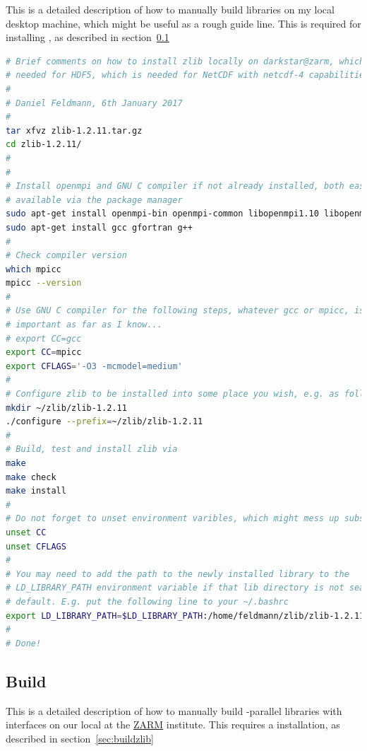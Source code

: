 \documentclass[a4paper, 11pt, DIV=11]{scrartcl}
\begin{document}
This is a detailed description of how to manually build 
libraries on my local desktop machine, which might be useful as
a rough guide line. This is required
for installing \hdf, as described in section~\ref{sec:buildhdf}
\begin{lstlisting}[language=bash]
# Brief comments on how to install zlib locally on darkstar@zarm, which is
# needed for HDF5, which is needed for NetCDF with netcdf-4 capabilities.
#
# Daniel Feldmann, 6th January 2017
# 
tar xfvz zlib-1.2.11.tar.gz
cd zlib-1.2.11/
#
#
# Install openmpi and GNU C compiler if not already installed, both easily
# available via the package manager
sudo apt-get install openmpi-bin openmpi-common libopenmpi1.10 libopenmpi-dev mpi-default-bin mpi-default-dev
sudo apt-get install gcc gfortran g++
#
# Check compiler version
which mpicc
mpicc --version
#
# Use GNU C compiler for the following steps, whatever gcc or mpicc, is not
# important as far as I know...
# export CC=gcc
export CC=mpicc
export CFLAGS='-O3 -mcmodel=medium'
#
# Configure zlib to be installed into some place you wish, e.g. as follows 
mkdir ~/zlib/zlib-1.2.11
./configure --prefix=~/zlib/zlib-1.2.11
#
# Build, test and install zlib via
make
make check
make install
#
# Do not forget to unset environment varibles, which might mess up subsequent builds
unset CC
unset CFLAGS
#
# You may need to add the path to the newly installed library to the
# LD_LIBRARY_PATH environment variable if that lib directory is not searched by
# default. E.g. put the following line to your ~/.bashrc
export LD_LIBRARY_PATH=$LD_LIBRARY_PATH:/home/feldmann/zlib/zlib-1.2.11/lib
# 
# Done!
\end{lstlisting}



\subsection{Build \hdf}
\label{sec:buildhdf}
This is a detailed description of how to manually build \mpi-parallel \hdf
libraries with \fortran interfaces on our local  at the
\href{https://www.zarm.uni-bremen.de/en/}{ZARM} institute. This requires
a  installation, as described in section~\ref{sec:buildzlib}
\end{document}
